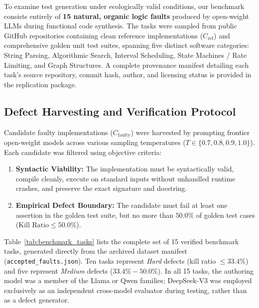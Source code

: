 \documentclass[11pt,a4paper]{article}
\begin{document}
To examine test generation under ecologically valid conditions, our benchmark consists entirely of \textbf{15 natural, organic logic faults} produced by open-weight LLMs during functional code synthesis. The tasks were sampled from public GitHub repositories containing clean reference implementations ($C_{\text{ref}}$) and comprehensive golden unit test suites, spanning five distinct software categories: String Parsing, Algorithmic Search, Interval Scheduling, State Machines / Rate Limiting, and Graph Structures. A complete provenance manifest detailing each task's source repository, commit hash, author, and licensing status is provided in the replication package.

\subsection{Defect Harvesting and Verification Protocol}
Candidate faulty implementations ($C_{\text{faulty}}$) were harvested by prompting frontier open-weight models across various sampling temperatures ($T \in \{0.7, 0.8, 0.9, 1.0\}$). Each candidate was filtered using objective criteria:
\begin{enumerate}
    \item \textbf{Syntactic Viability:} The implementation must be syntactically valid, compile cleanly, execute on standard inputs without unhandled runtime crashes, and preserve the exact signature and docstring.
    \item \textbf{Empirical Defect Boundary:} The candidate must fail at least one assertion in the golden test suite, but no more than $50.0\%$ of golden test cases ($\text{Kill Ratio} \le 50.0\%$).
\end{enumerate}

Table~\ref{tab:benchmark_tasks} lists the complete set of 15 verified benchmark tasks, generated directly from the archived dataset manifest (\texttt{accepted\_faults.json}). 
Ten tasks represent \textit{Hard} defects (kill ratio $\le 33.4\%$) and five represent \textit{Medium} defects ($33.4\% - 50.0\%$). In all 15 tasks, the authoring model was a member of the Llama or Qwen families; DeepSeek-V3 was employed exclusively as an independent cross-model evaluator during testing, rather than as a defect generator.
\end{document}
